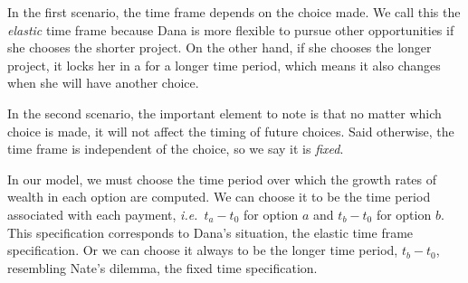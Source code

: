 \documentclass[11pt]{article}
\newcommand{\ie}{{\it i.e.}\ }
\newcommand{\Dt}{\Delta t}
\numberwithin{equation}{section}
\begin{document}
In the first scenario, the time frame depends on the choice made. We call this the \textit{elastic} time frame because Dana is more flexible to pursue other opportunities if she chooses the shorter project. On the other hand, if she chooses the longer project, it locks her in a for a longer time period, which means it also changes when she will have another choice.  

In the second scenario, the important element to note is that no matter which choice is made, it will not affect the timing of future choices. Said otherwise, the time frame is independent of the choice, so we say it is \textit{fixed}.

In our model, we must choose the time period over which the growth rates of wealth in each option are computed. We can choose it to be the time period associated with each payment, \ie $t_a-t_0$ for option $a$ and $t_b-t_0$ for option $b$. This specification corresponds to Dana's situation, the elastic time frame specification. Or we can choose it always to be the longer time period, $t_b-t_0$, resembling Nate's dilemma, the fixed time specification.




\end{document}
